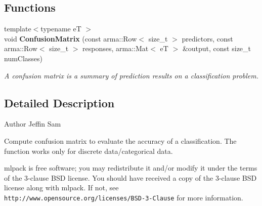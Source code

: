 \subsection*{Functions}
\begin{DoxyCompactItemize}
\item 
{\footnotesize template$<$typename eT $>$ }\\void \textbf{ Confusion\+Matrix} (const arma\+::\+Row$<$ size\+\_\+t $>$ predictors, const arma\+::\+Row$<$ size\+\_\+t $>$ responses, arma\+::\+Mat$<$ eT $>$ \&output, const size\+\_\+t num\+Classes)
\begin{DoxyCompactList}\small\item\em A confusion matrix is a summary of prediction results on a classification problem. \end{DoxyCompactList}\end{DoxyCompactItemize}


\subsection{Detailed Description}
\begin{DoxyAuthor}{Author}
Jeffin Sam
\end{DoxyAuthor}
Compute confusion matrix to evaluate the accuracy of a classification. The function works only for discrete data/categorical data.

mlpack is free software; you may redistribute it and/or modify it under the terms of the 3-\/clause B\+SD license. You should have received a copy of the 3-\/clause B\+SD license along with mlpack. If not, see {\tt http\+://www.\+opensource.\+org/licenses/\+B\+S\+D-\/3-\/\+Clause} for more information. 